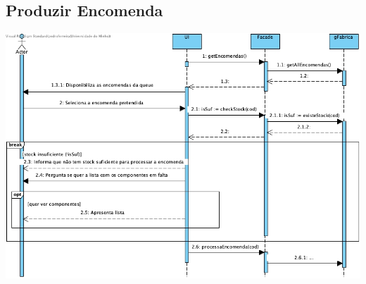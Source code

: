 \subsection{Produzir Encomenda}
\begin{center}
    \centering
 	\includegraphics[width = 5.5in]{DSSS/DSSS-Produzir_Encomenda.jpg}
\end{center}
\newpage